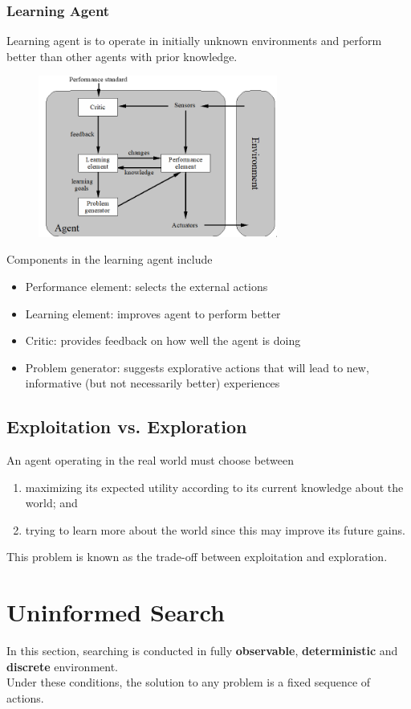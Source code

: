 \documentclass[12pt]{article}
\theoremstyle{definition}
\begin{document}
\subsubsection{Learning Agent}
Learning agent is to operate in initially unknown environments and perform better than other agents with prior knowledge.
\begin{figure}[h]
\centering
\includegraphics[width = 0.7\textwidth]{2_5.png}
\end{figure}
Components in the learning agent include
\begin{itemize}
\item Performance element: selects the external actions
\item Learning element: improves agent to perform better
\item Critic: provides feedback on how well the agent is doing
\item Problem generator: suggests explorative actions that will lead to new, informative (but not necessarily better) experiences
\end{itemize}
\subsection{Exploitation vs. Exploration}
An agent operating in the real world must choose between
\begin{enumerate}
	\item maximizing its expected utility according to its current knowledge about the world; and 
	\item trying to learn more about the world since this may improve its future gains. 
\end{enumerate}
This problem is known as the trade-off between exploitation and exploration.
\clearpage
\section{Uninformed Search}
In this section, searching is conducted in fully \textbf{observable}, \textbf{deterministic} and \textbf{discrete} environment.\\
Under these conditions, the solution to any problem is a fixed sequence of actions.
\end{document}
